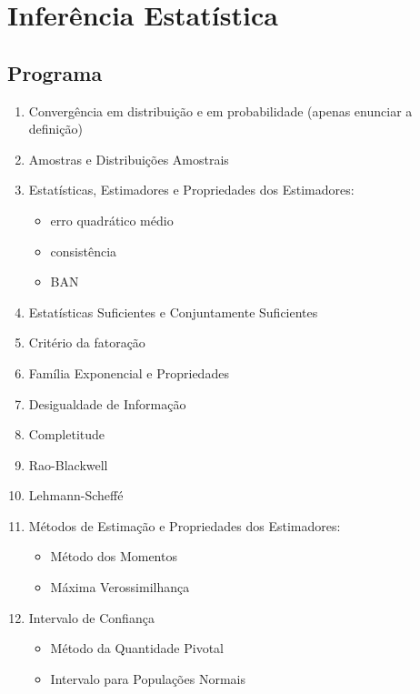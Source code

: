 \chapter[Inferência Estatística]{Inferência Estatística}
\label{ch:statistical_inference}


\section[Programa da disciplina]{Programa}\label{sec:inference_program}

\begin{enumerate}
  \item {Convergência em distribuição e em probabilidade (apenas enunciar a definição)}
  \item {Amostras e Distribuições Amostrais}
  \item {Estatísticas, Estimadores e Propriedades dos Estimadores:}
    \begin{itemize}
      \item {erro quadrático médio}
      \item {consistência}
      \item {BAN}
    \end{itemize}
  \item {Estatísticas Suficientes e Conjuntamente Suficientes}
  \item {Critério da fatoração}
  \item {Família Exponencial e Propriedades}
  \item {Desigualdade de Informação}
  \item {Completitude}
  \item {Rao-Blackwell}
  \item {Lehmann-Scheffé}
  \item {Métodos de Estimação e Propriedades dos Estimadores:}
  \begin{itemize}
    \item {Método dos Momentos}
    \item {Máxima Verossimilhança}
  \end{itemize}
  \item {Intervalo de Confiança}
    \begin{itemize}
      \item {Método da Quantidade Pivotal}
      \item {Intervalo para Populações Normais}

\end{itemize}
\end{enumerate}

